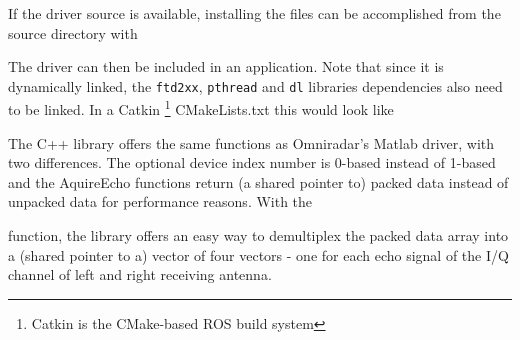 If the driver source is available, installing the files can be
accomplished from the source directory with

\begin{Shaded}
\begin{Highlighting}[]
\KeywordTok{&&} 
\end{Highlighting}
\end{Shaded}

The driver can then be included in an application. Note that since it is
dynamically linked, the \texttt{ftd2xx}, \texttt{pthread} and
\texttt{dl} libraries dependencies also need to be linked. In a Catkin
\footnote{Catkin is the CMake-based ROS build system} CMakeLists.txt
this would look like

\begin{Shaded}
\begin{Highlighting}[]
\NormalTok{(}
\NormalTok{)}
\end{Highlighting}
\end{Shaded}

The C++ library offers the same functions as Omniradar's Matlab driver,
with two differences. The optional device index number is 0-based
instead of 1-based and the AquireEcho functions return (a shared pointer
to) packed data instead of unpacked data for performance reasons. With
the

\begin{Shaded}
\begin{Highlighting}[]
 
\end{Highlighting}
\end{Shaded}

function, the library offers an easy way to demultiplex the packed data
array into a (shared pointer to a) vector of four vectors - one for each
echo signal of the I/Q channel of left and right receiving antenna.

